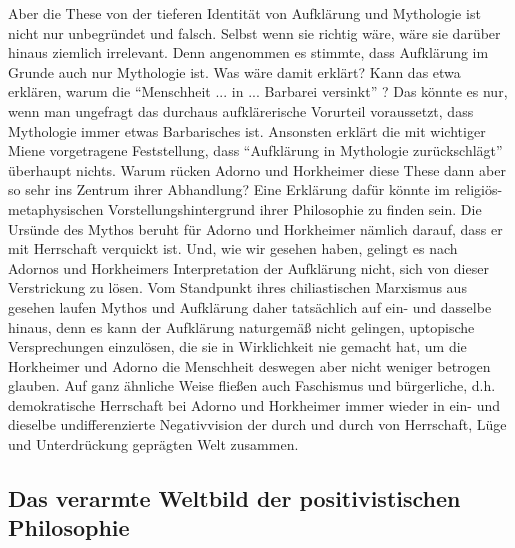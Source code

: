 \documentclass[12pt,a4paper,ngerman]{article}
\begin{document}
Aber die These von der tieferen Identität von Aufklärung und
Mythologie ist nicht nur unbegründet und falsch. Selbst wenn sie
richtig wäre, wäre sie darüber hinaus ziemlich irrelevant. Denn
angenommen es stimmte, dass Aufklärung im Grunde auch nur Mythologie
ist. Was wäre damit erklärt? Kann das etwa erklären, warum die
"`Menschheit ... in ... Barbarei versinkt"' \cite[S.
1]{adorno-horkheimer:1947}? Das könnte es nur, wenn man ungefragt das
durchaus aufklärerische Vorurteil voraussetzt, dass Mythologie immer
etwas Barbarisches ist. Ansonsten erklärt die mit wichtiger Miene
vorgetragene Feststellung, dass "`Aufklärung in Mythologie
zurückschlägt"' überhaupt nichts. Warum rücken Adorno und Horkheimer
diese These dann aber so sehr ins Zentrum ihrer Abhandlung?  Eine
Erklärung dafür könnte im religiös-metaphysischen
Vorstellungshintergrund ihrer Philosophie zu finden sein. Die Ursünde
des Mythos beruht für Adorno und Horkheimer nämlich darauf, dass er
mit Herrschaft verquickt ist. Und, wie wir gesehen haben, gelingt es
nach Adornos und Horkheimers Interpretation der Aufklärung nicht, sich
von dieser Verstrickung zu lösen. Vom Standpunkt ihres chiliastischen
Marxismus aus gesehen laufen Mythos und Aufklärung daher tatsächlich
auf ein- und dasselbe hinaus, denn es kann der Aufklärung naturgemäß
nicht gelingen, uptopische Versprechungen einzulösen, die sie in
Wirklichkeit nie gemacht hat, um die Horkheimer und Adorno die
Menschheit deswegen aber nicht weniger betrogen glauben. Auf ganz
ähnliche Weise fließen auch Faschismus und bürgerliche, d.h.
demokratische Herrschaft bei Adorno und Horkheimer immer wieder in
ein- und dieselbe undifferenzierte Negativvision der durch und durch
von Herrschaft, Lüge und Unterdrückung geprägten Welt zusammen.

\subsection{Das verarmte Weltbild der positivistischen Philosophie}
\end{document}
